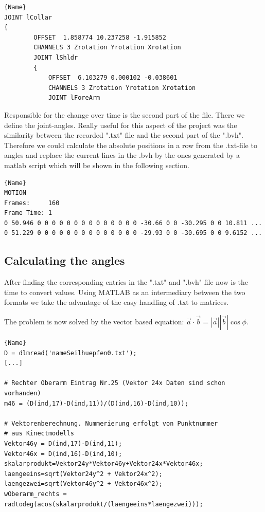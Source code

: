 \documentclass[a4paper]{article}
\begin{document}
\begin{lstlisting}[caption=.bvh Connected Structure]{Name}
JOINT lCollar
{
		OFFSET	1.858774 10.237258 -1.915852
		CHANNELS 3 Zrotation Yrotation Xrotation
		JOINT lShldr
		{
			OFFSET	6.103279 0.000102 -0.038601
			CHANNELS 3 Zrotation Yrotation Xrotation
			JOINT lForeArm
\end{lstlisting}

Responsible for the change over time is the second part of the file.
There we define the joint-angles.
Really useful for this aspect of the project was the similarity between the recorded ".txt" file and the second part of the ".bvh".
Therefore we could calculate the absolute positions in a row from the .txt-file to angles and replace the current lines in the .bvh by the ones generated by a matlab script which will be shown in the following section.

\begin{lstlisting}[caption=Motionpart of .bvh]{Name}
MOTION
Frames:     160
Frame Time: 1                
0 50.946 0 0 0 0 0 0 0 0 0 0 0 0 0 0 -30.66 0 0 -30.295 0 0 10.811 ...
0 51.229 0 0 0 0 0 0 0 0 0 0 0 0 0 0 -29.93 0 0 -30.695 0 0 9.6152 ...
\end{lstlisting}

\subsection{Calculating the angles}

After finding the corresponding entries in the ".txt" and ".bvh" file now is the time to convert values.
Using MATLAB as an intermediary between the two formats we take the advantage of the easy handling of .txt to matrices.

The problem is now solved by the vector based equation: $\vec a \cdot \vec b = \left|\vec a \right| \left|\vec b \right| \cos \phi$.

\begin{lstlisting}[caption=Calculating the angle]{Name}
D = dlmread('nameSeilhuepfen0.txt');
[...]

# Rechter Oberarm Eintrag Nr.25 (Vektor 24x Daten sind schon vorhanden)
m46 = (D(ind,17)-D(ind,11))/(D(ind,16)-D(ind,10));

# Vektorenberechnung. Nummerierung erfolgt von Punktnummer 
# aus Kinectmodells
Vektor46y = D(ind,17)-D(ind,11);
Vektor46x = D(ind,16)-D(ind,10);
skalarprodukt=Vektor24y*Vektor46y+Vektor24x*Vektor46x;
laengeeins=sqrt(Vektor24y^2 + Vektor24x^2);
laengezwei=sqrt(Vektor46y^2 + Vektor46x^2); 
wOberarm_rechts = radtodeg(acos(skalarprodukt/(laengeeins*laengezwei)));
\end{lstlisting}
\end{document}
